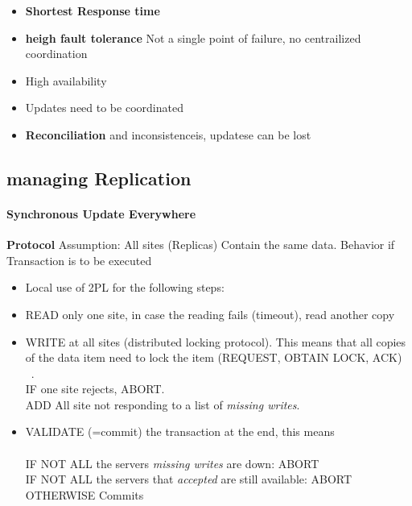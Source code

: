 \documentclass[a4paper,12pt]{article}%
\begin{document}
 {\color[HTML]{9AB299} 
 \begin{itemize}
  \item {\bf Shortest Response time}
  \item {\bf heigh fault tolerance} Not a single point of failure, no centrailized coordination
  \item High availability
 \end{itemize}

 }   
{\color[HTML]{A38C8C}
 \begin{itemize}
 \item Updates need to be coordinated
 \item {\bf Reconciliation} and inconsistenceis, updatese can be lost 
 \end{itemize}
 }
 
 
 
 
 \subsection{managing Replication}
 
 
 
 
 
 \paragraph{Synchronous Update Everywhere}
 
 {\bf Protocol}
 Assumption: All sites (Replicas) Contain the same data. Behavior if Transaction is to be executed
 \begin{itemize}
  \item Local use of 2PL for the following steps:
  \item READ only one site, in case the reading fails (timeout), read another copy
  \item WRITE at all sites (distributed locking protocol). This means that all copies of the data item need to lock the item (REQUEST, OBTAIN LOCK, ACK)\\~. \\
  IF one site rejects, ABORT. \\
  ADD All site not responding to a list of {\it missing writes}.
  \item VALIDATE (=commit) the transaction at the end, this means\\~ \\ 
  IF NOT ALL the servers {\it missing writes} are down: ABORT \\
  IF NOT ALL the servers that {\it accepted} are still available: ABORT \\
  OTHERWISE Commits
 \end{itemize}
\end{document}
